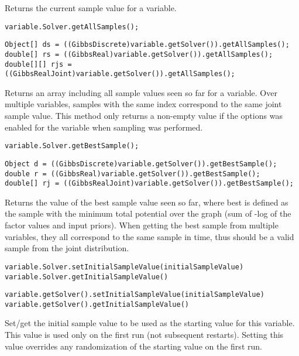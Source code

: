 Returns the current sample value for a variable.

\ifmatlab
\begin{lstlisting}
variable.Solver.getAllSamples();
\end{lstlisting}
\fi

\ifjava
\begin{lstlisting}
Object[] ds = ((GibbsDiscrete)variable.getSolver()).getAllSamples();
double[] rs = ((GibbsReal)variable.getSolver()).getAllSamples();
double[][] rjs = ((GibbsRealJoint)variable.getSolver()).getAllSamples();
\end{lstlisting}
\fi

Returns an array including all sample values seen so far for a variable. Over multiple variables, samples with the same index correspond to the same joint sample value. This method only returns a non-empty value if the  options was enabled for the variable when sampling was performed.

\ifmatlab
\begin{lstlisting}
variable.Solver.getBestSample();
\end{lstlisting}
\fi

\ifjava
\begin{lstlisting}
Object d = ((GibbsDiscrete)variable.getSolver()).getBestSample();
double r = ((GibbsReal)variable.getSolver()).getBestSample();
double[] rj = ((GibbsRealJoint)variable.getSolver()).getBestSample();
\end{lstlisting}
\fi


Returns the value of the best sample value seen so far, where best is defined as the sample with the minimum total potential over the graph (sum of -log of the factor values and input priors).  When getting the best sample from multiple variables, they all correspond to the same sample in time, thus should be a valid sample from the joint distribution.

\ifmatlab
\begin{lstlisting}
variable.Solver.setInitialSampleValue(initialSampleValue)
variable.Solver.getInitialSampleValue()
\end{lstlisting}
\fi

\ifjava
\begin{lstlisting}
variable.getSolver().setInitialSampleValue(initialSampleValue)
variable.getSolver().getInitialSampleValue()
\end{lstlisting}
\fi

Set/get the initial sample value to be used as the starting value for this variable.  This value is used only on the first run (not subsequent restarts).  Setting this value overrides any randomization of the starting value on the first run.


